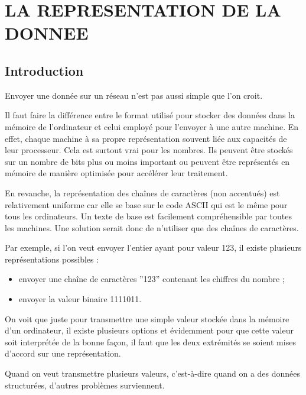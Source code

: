 \chapter{LA REPRESENTATION DE LA DONNEE}

\section{Introduction}
     \vspace{1em}

Envoyer une donnée sur un réseau n’est pas aussi simple que l’on croit.
     \vspace{1em}

Il faut faire la différence entre le format utilisé pour stocker des données dans la mémoire de l'ordinateur et celui employé pour l'envoyer à une autre machine. En effet, chaque machine à sa propre représentation souvent liée aux capacités de leur processeur. Cela est surtout vrai pour les nombres. Ils peuvent être stockés sur un nombre de bits plus ou moins important ou peuvent être représentés en mémoire de manière optimisée pour accélérer leur traitement. 

En revanche, la représentation des chaînes de caractères (non accentués) est relativement uniforme car elle se base sur le code ASCII qui est le même pour tous les ordinateurs. Un texte de base est facilement compréhensible par toutes les machines. Une solution serait donc de n'utiliser que des chaînes de caractères. 

     \vspace{1em}

Par exemple, si l’on veut envoyer l'entier ayant pour valeur 123, il existe plusieurs représentations possibles :
\begin{itemize}
\item envoyer une chaîne de caractères ”123” contenant les chiffres du nombre ;
\item envoyer la valeur binaire 1111011.
\end{itemize}

     \vspace{1em}

On voit que juste pour transmettre une simple valeur stockée dans la mémoire d'un ordinateur, il existe plusieurs options et évidemment pour que cette valeur soit interprétée de la bonne façon, il faut que les deux extrémités se soient mises d'accord sur une représentation.

Quand on veut transmettre plusieurs valeurs, c'est-à-dire quand on a des données structurées, d'autres problèmes surviennent.

